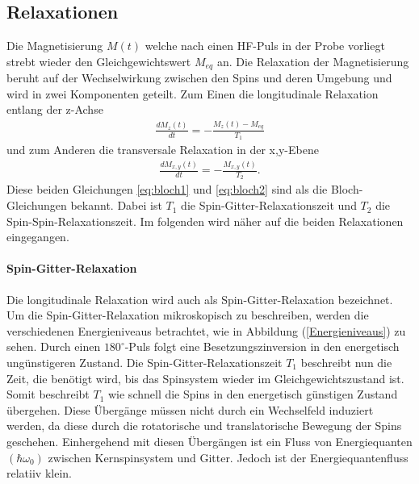 \subsection{Relaxationen}
Die Magnetisierung $M(t)$ welche nach einen HF-Puls in der Probe vorliegt strebt wieder den Gleichgewichtswert $M_{eq}$ an.
Die Relaxation der Magnetisierung beruht auf der Wechselwirkung zwischen den Spins und deren Umgebung und wird in zwei Komponenten geteilt.
Zum Einen die longitudinale Relaxation entlang der z-Achse
\begin{align}
	\frac{d M_z(t)}{d t} = - \frac{M_z(t) - M_{eq}}{T_1} 
	\label{eq:bloch1}
\end{align}
und zum Anderen die transversale Relaxation in der x,y-Ebene
\begin{align}
	\frac{d M_{x,y}(t)}{d t} = - \frac{M_{x,y}(t)}{T_2}. 
	\label{eq:bloch2}
\end{align}
Diese beiden Gleichungen \eqref{eq:bloch1} und \eqref{eq:bloch2} sind als die Bloch-Gleichungen bekannt.
Dabei ist $T_1$ die Spin-Gitter-Relaxationszeit und $T_2$ die Spin-Spin-Relaxationszeit.
Im folgenden wird n\"{a}her auf die beiden Relaxationen eingegangen.

\paragraph{Spin-Gitter-Relaxation}
Die longitudinale Relaxation wird auch als Spin-Gitter-Relaxa{\-}tion bezeichnet.
Um die Spin-Gitter-Relaxation mikroskopisch zu beschreiben, werden die verschiedenen Energieniveaus betrachtet, wie in Abbildung (\ref{Energieniveaus}) zu sehen.
Durch einen $180^{\circ}$-Puls folgt eine Besetzungszinversion in den energetisch ung\"{u}nstigeren Zustand.
Die Spin-Gitter-Relaxationszeit $T_1$ beschreibt nun die Zeit, die ben\"{o}tigt wird, bis das Spinsystem wieder im Gleichgewichtszustand ist.
Somit beschreibt $T_1$ wie schnell  die Spins in den energetisch g\"{u}nstigen Zustand \"{u}bergehen.
Diese \"{U}berg\"{a}nge m\"{u}ssen nicht durch ein Wechselfeld induziert werden, da diese durch die rotatorische und translatorische Bewegung der Spins geschehen.
Einhergehend mit diesen \"{U}berg\"{a}ngen ist ein Fluss von Energiequanten $(\hbar \omega_0)$ zwischen Kernspinsystem und Gitter.
Jedoch ist der Energiequantenfluss relatiiv klein.

